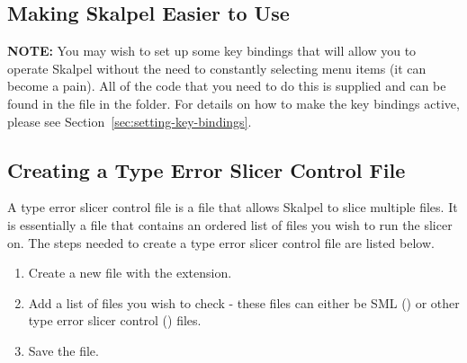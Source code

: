 \documentclass{article}
\begin{document}

\subsection{Making Skalpel Easier to Use}

\textbf{NOTE:} You may wish to set up some key bindings that will
allow you to operate Skalpel without the need to
constantly selecting menu items (it can become a pain).  All of the
code that you need to do this is supplied and can be found in the
 file in the  folder.
For details on how to make the key bindings active, please see
Section~\ref{sec:setting-key-bindings}.


\subsection{Creating a Type Error Slicer Control File}
\label{sec:skalpel-control-files}

A type error slicer control file is a file that allows Skalpel to
slice multiple files. It is essentially a file that contains an
ordered list of files you wish to run the slicer on. The steps needed
to create a type error slicer control file are listed below.

\begin{enumerate}
\item Create a new file with the  extension.
\item Add a list of files you wish to check - these files can either
  be SML () or other type error slicer control
  () files.

\item Save the file.
\end{enumerate}


\newpage

\end{document}
